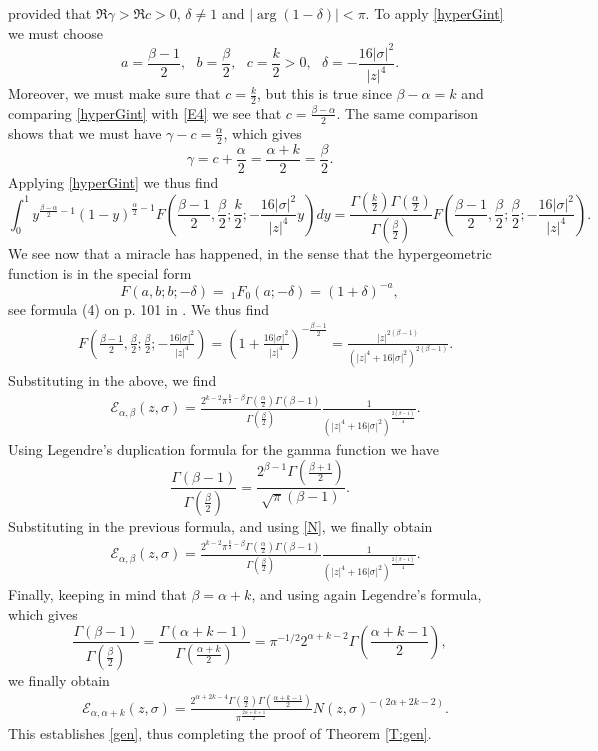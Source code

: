 \documentclass[11pt,a4paper]{amsart}
\def \G{\Gamma}
\numberwithin{equation}{section}
\numberwithin{equation}{section}
\begin{document}
provided that $\Re \gamma >\Re c>0$, $\delta\not=1$ and $|\arg(1-\delta)|<\pi$. To apply \eqref{hyperGint} we must choose
\begin{equation}\label{abc}
a = \frac{\beta-1}2,\ \ \ b = \frac{\beta}2,\ \ \ c = \frac k2>0,\ \ \ \delta = - \frac{16|\sigma|^2}{|z|^4}.
\end{equation}
Moreover, we must make sure that $c = \frac k2$, but this is true since $\beta - \alpha = k$ and comparing \eqref{hyperGint} with \eqref{E4} we see that $c = \frac{\beta-\alpha}{2}$. The same comparison shows that we must have $\gamma-c = \frac{\alpha}2$, which gives
\[
\gamma = c + \frac{\alpha}2 = \frac{\alpha+k}2 = \frac{\beta}2.
\] 
Applying \eqref{hyperGint} we thus find
\[
\int_0^1 y^{\frac{\beta-\alpha}{2}-1} \left(1-y\right)^{\frac{\alpha}2 -1}  F\left(\frac{\beta-1}{2},\frac{\beta}2;\frac k2;- \frac{16|\sigma|^2}{|z|^4} y\right) dy = \frac{\G(\frac k2)\G(\frac{\alpha}2)}{\G(\frac{\beta}2)} F(\frac{\beta-1}2,\frac{\beta}2;\frac{\beta}2;- \frac{16|\sigma|^2}{|z|^4}).
\]
We see now that a miracle has happened, in the sense that the hypergeometric function is in the special form
\begin{equation}\label{F}
F(a,b;b;-\delta) =\ _1F_0(a;-\delta) = (1+\delta)^{-a},
\end{equation}
see formula (4) on p. 101 in \cite{E}. We thus find
\begin{align*}
& F(\frac{\beta-1}2,\frac{\beta}2;\frac{\beta}2;- \frac{16|\sigma|^2}{|z|^4}) = \left(1+\frac{16|\sigma|^2}{|z|^4}\right)^{-\frac{\beta-1}2}
= \frac{|z|^{2(\beta-1)}}{\left(|z|^4 + 16 |\sigma|^2\right)^{2(\beta-1)}}.
\end{align*}
Substituting in the above, we find
\begin{align*}\label{E5}
& \mathscr E_{\alpha,\beta}(z,\sigma) = \frac{2^{k-2} \pi^{\frac k2-\beta}\G(\frac{\alpha}2)\G(\beta-1)}{\G(\frac{\beta}2)} \frac{1}{\left(|z|^4 + 16 |\sigma|^2\right)^{\frac{2(\beta-1)}{4}}}.
\end{align*} 
Using Legendre's duplication formula for the gamma function we have
\[
\frac{\G(\beta-1)}{\G(\frac{\beta}2)} = \frac{2^{\beta-1} \G(\frac{\beta+1}2)}{\sqrt \pi (\beta-1)}.
\]
Substituting in the previous formula, and using \eqref{N}, we finally obtain 
\begin{align*}\label{E5}
& \mathscr E_{\alpha,\beta}(z,\sigma) = \frac{2^{k-2} \pi^{\frac k2-\beta}\G(\frac{\alpha}2)\G(\beta-1)}{\G(\frac{\beta}2)} \frac{1}{\left(|z|^4 + 16 |\sigma|^2\right)^{\frac{2(\beta-1)}{4}}}.
\end{align*} 
Finally, keeping in mind that $\beta = \alpha + k$, and using again Legendre's formula, which gives
\[
\frac{\G(\beta-1)}{\G(\frac \beta2)} = \frac{\G(\alpha+k-1)}{\G(\frac{\alpha+k}2)} = \pi^{-1/2} 2^{\alpha+k-2} \G(\frac{\alpha+k-1}2),
\]
we finally obtain 
\begin{align*}
& \mathscr E_{\alpha,\alpha+k}(z,\sigma) = \frac{2^{\alpha + 2k-4}\G(\frac{\alpha}2) \G(\frac{\alpha + k -1}2)}{\pi^{\frac{2\alpha+k+1}2}} N(z,\sigma)^{-(2\alpha+2k-2)}.
\end{align*}
This establishes \eqref{gen}, thus completing the proof of Theorem \ref{T:gen}.
\end{document}
